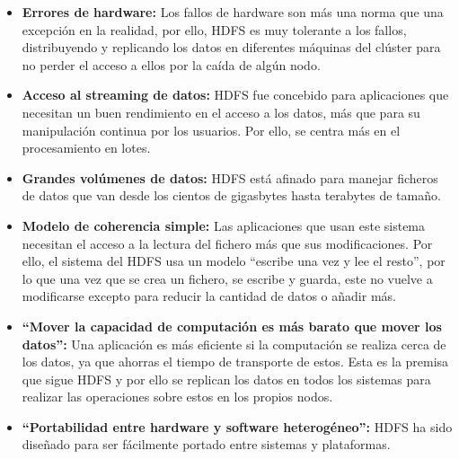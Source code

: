 \begin{itemize}
	\item \textbf{Errores de hardware:} Los fallos de hardware son más una norma que una excepción en la realidad, por ello, \gls{HDFS} es muy tolerante a los fallos, distribuyendo y replicando los datos en diferentes máquinas del clúster para no perder el acceso a ellos por la caída de algún nodo.
	
	\item \textbf{Acceso al streaming de datos:} \gls{HDFS} fue concebido para aplicaciones que necesitan un buen rendimiento en el acceso a los datos, más que para su manipulación continua por los usuarios. Por ello, se centra más en el procesamiento en lotes.
	
	\item \textbf{Grandes volúmenes de datos:} \gls{HDFS} está afinado para manejar ficheros de datos que van desde los cientos de gigasbytes hasta terabytes de tamaño.
	
	\item \textbf{Modelo de coherencia simple:} Las aplicaciones que usan este sistema necesitan el acceso a la lectura del fichero más que sus modificaciones. Por ello, el sistema del \gls{HDFS} usa un modelo ``escribe una vez y lee el resto'', por lo que una vez que se crea un fichero, se escribe y guarda, este no vuelve a modificarse excepto para reducir la cantidad de datos o añadir más.
	
	\item \textbf{``Mover la capacidad de computación es más barato que mover los datos'':} Una aplicación es más eficiente si la computación se realiza cerca de los datos, ya que ahorras el tiempo de transporte de estos. Esta es la premisa que sigue \gls{HDFS} y por ello se replican los datos en todos los sistemas para realizar las operaciones sobre estos en los propios nodos.
	
	\item \textbf{``Portabilidad entre hardware y software heterogéneo'': } \gls{HDFS} ha sido diseñado para ser fácilmente portado entre sistemas y plataformas.
\end{itemize}

